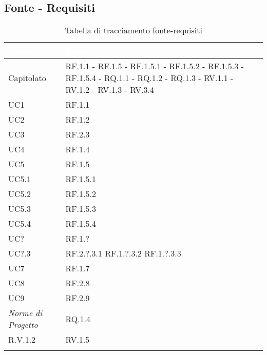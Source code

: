 \subsection{Fonte - Requisiti}
\begin{center}
  \centering
  \begin{longtable}{|C{6cm}|C{6cm}|}
    \hline
    \textcolor[HTML]{FFFFFF}{\textbf{Fonte}} & \textcolor[HTML]{FFFFFF}{\textbf{Requisiti}} \\ \hline
    Capitolato & RF.1.1 - RF.1.5 - RF.1.5.1 - RF.1.5.2 - RF.1.5.3 - RF.1.5.4 - RQ.1.1 - RQ.1.2 - RQ.1.3 - RV.1.1 - RV.1.2 - RV.1.3 - RV.3.4 \\ \hline
    UC1 & RF.1.1 \\ \hline
    UC2 & RF.1.2 \\ \hline
    UC3 & RF.2.3 \\ \hline
    UC4 & RF.1.4 \\ \hline
    UC5 & RF.1.5 \\ \hline
    UC5.1 & RF.1.5.1 \\ \hline
    UC5.2 & RF.1.5.2 \\ \hline
    UC5.3 & RF.1.5.3 \\ \hline
    UC5.4 & RF.1.5.4 \\ \hline
    UC? & RF.1.? \\ \hline
    UC?.3 & RF.2.?.3.1 RF.1.?.3.2 RF.1.?.3.3  \\ \hline
    UC7 & RF.1.7 \\ \hline
    UC8 & RF.2.8 \\ \hline
    UC9 & RF.2.9 \\ \hline
    \textit{Norme di Progetto} & RQ.1.4 \\ \hline
    R.V.1.2 & RV.1.5 \\ \hline

    \caption{Tabella di tracciamento fonte-requisiti}
  \end{longtable}
\end{center}

